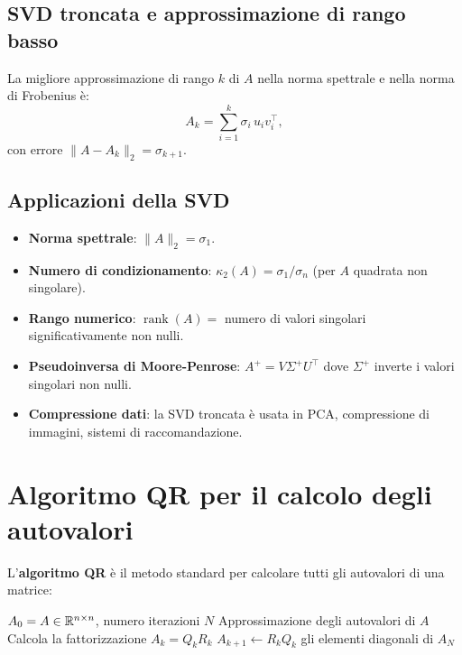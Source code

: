 \subsection{SVD troncata e approssimazione di rango basso}

\begin{theorem}
La migliore approssimazione di rango $k$ di $A$ nella norma spettrale e nella
norma di Frobenius è:
\begin{equation}
  A_k = \sum_{i=1}^k \sigma_i\, u_i v_i^\top,
  \label{eq:svd_troncata}
\end{equation}
con errore $\|A - A_k\|_2 = \sigma_{k+1}$.
\end{theorem}

\subsection{Applicazioni della SVD}

\begin{itemize}
  \item \textbf{Norma spettrale}: $\|A\|_2 = \sigma_1$.
  \item \textbf{Numero di condizionamento}: $\kappa_2(A) = \sigma_1 / \sigma_n$ (per
        $A$ quadrata non singolare).
  \item \textbf{Rango numerico}: $\operatorname{rank}(A) = $ numero di valori singolari
        significativamente non nulli.
  \item \textbf{Pseudoinversa di Moore-Penrose}: $A^+ = V\Sigma^+ U^\top$ dove
        $\Sigma^+$ inverte i valori singolari non nulli.
  \item \textbf{Compressione dati}: la SVD troncata è usata in PCA, compressione di
        immagini, sistemi di raccomandazione.
\end{itemize}

\section{Algoritmo QR per il calcolo degli autovalori}
\label{sec:algo_qr}

L'\textbf{algoritmo QR} è il metodo standard per calcolare tutti gli autovalori
di una matrice:

\begin{algorithm}[htbp]
  \caption{Algoritmo QR (forma base)}
  \label{alg:qr_autoval}
  \begin{algorithmic}[1]
    \Require $A_0 = A \in \mathbb{R}^{n \times n}$, numero iterazioni $N$
    \Ensure Approssimazione degli autovalori di $A$
      \State Calcola la fattorizzazione $A_k = Q_k R_k$
      \State $A_{k+1} \gets R_k Q_k$
    \EndFor
    \State \Return gli elementi diagonali di $A_N$
  \end{algorithmic}
\end{algorithm}

